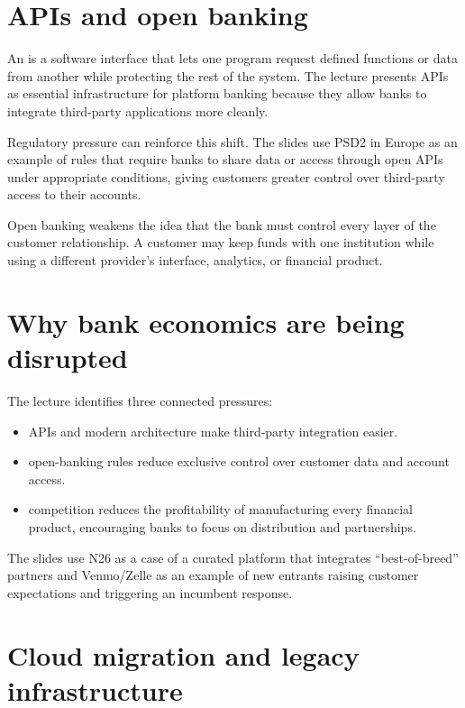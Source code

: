 \section{APIs and open banking}

An  is a software interface that lets one program request defined functions or data from another while protecting the rest of the system. The lecture presents APIs as essential infrastructure for platform banking because they allow banks to integrate third-party applications more cleanly.

Regulatory pressure can reinforce this shift. The slides use PSD2 in Europe as an example of rules that require banks to share data or access through open APIs under appropriate conditions, giving customers greater control over third-party access to their accounts.

\begin{keyidea}
Open banking weakens the idea that the bank must control every layer of the customer relationship. A customer may keep funds with one institution while using a different provider's interface, analytics, or financial product.
\end{keyidea}

\section{Why bank economics are being disrupted}

The lecture identifies three connected pressures:

\begin{itemize}
  \item {} APIs and modern architecture make third-party integration easier.
  \item {} open-banking rules reduce exclusive control over customer data and account access.
  \item {} competition reduces the profitability of manufacturing every financial product, encouraging banks to focus on distribution and partnerships.
\end{itemize}

The slides use N26 as a case of a curated platform that integrates ``best-of-breed'' partners and Venmo/Zelle as an example of new entrants raising customer expectations and triggering an incumbent response.

\section{Cloud migration and legacy infrastructure}

